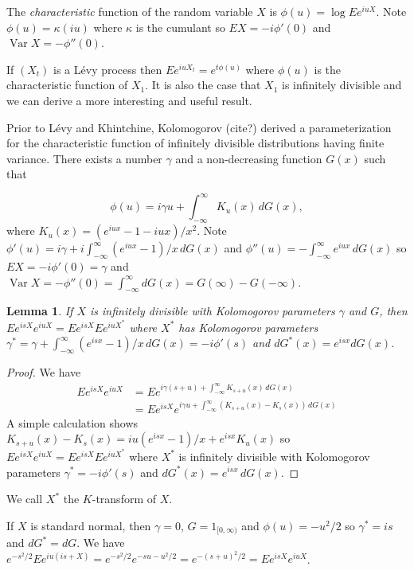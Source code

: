 \documentclass[fleqn]{amsart}
\providecommand{\Var}{\mathop{\mathrm{Var}}}
\newtheorem{lemma}[theorem]{Lemma}
\begin{document}
The {\em characteristic} function of the random variable \(X\)
is \(\phi(u) = \log E e^{iuX}\). Note \(\phi(u) = \kappa(iu)\)
where \(\kappa\) is the cumulant so \(E X = -i\phi'(0)\)
and \(\Var X = -\phi''(0)\).

If \((X_t)\) is a L\'evy process then \(E e^{iuX_t} = e^{t\phi(u)}\)
where \(\phi(u)\) is the characteristic function of \(X_1\).
It is also the case that \(X_1\) is infinitely divisible and we
can derive a more interesting and useful result.

Prior to L\'evy and Khintchine, Kolomogorov (cite?) derived a
parameterization for the characteristic function of infinitely divisible
distributions having finite variance. There exists a number \(\gamma\)
and a non-decreasing function \(G(x)\) such that

\[
\phi(u) = i\gamma u + \int_{-\infty}^\infty K_u(x)\,dG(x),
\]
where \(K_u(x) = (e^{iux} - 1 - iux)/x^2\).
Note \(\phi'(u) = i\gamma + i\int_{-\infty}^\infty (e^{iux} - 1)/x\,dG(x)\)
and \(\phi''(u) = -\int_{-\infty}^\infty e^{iux}\,dG(x)\)
so \(E X = -i\phi'(0) = \gamma\) and \(\Var X = -\phi''(0)
= \int_{-\infty}^\infty dG(x) = G(\infty) - G(-\infty)\).

\begin{lemma}
If \(X\) is infinitely divisible with Kolomogorov parameters \(\gamma\)
and \(G\), then \(Ee^{isX}e^{iuX} = Ee^{isX}Ee^{iuX^*}\) where
\(X^*\) has Kolomogorov parameters \(\gamma^*
= \gamma + \int_{-\infty}^\infty (e^{isx} - 1)/x\,dG(x) = -i\phi'(s)\)
and \(dG^*(x) = e^{isx}dG(x)\).
\end{lemma}
\begin{proof}
We have
\begin{align*}
E e^{isX}e^{iuX} &= E e^{i\gamma(s+u) + \int_{-\infty}^\infty K_{s+u}(x)\,dG(x)}\\
	&= Ee^{isX} e^{i\gamma u
		+ \int_{-\infty}^\infty (K_{s+u}(x) - K_s(x))\,dG(x)}
\end{align*}
A simple calculation shows
\(K_{s+u}(x) - K_s(x) = iu(e^{isx} - 1)/x + e^{isx}K_u(x)\)
so \(E e^{isX}e^{iuX} = Ee^{isX}Ee^{iuX^*}\) where \(X^*\) is
infinitely divisible with Kolomogorov parameters
\(\gamma^* = -i\phi'(s)\) and \(dG^*(x) = e^{isx}\,dG(x)\).
\end{proof}

We call \(X^*\) the \(K\)-transform of \(X\).

If \(X\) is standard normal, then \(\gamma = 0\), \(G = 1_{[0,\infty)}\)
and \(\phi(u) = -u^2/2\) so \(\gamma^* = is\) and \(dG^* = dG\).
We have \(e^{-s^2/2}Ee^{iu(is + X)} = e^{-s^2/2}e^{-su - u^2/2}
= e^{-(s + u)^2/2} = Ee^{isX}e^{iuX}\).
\end{document}
